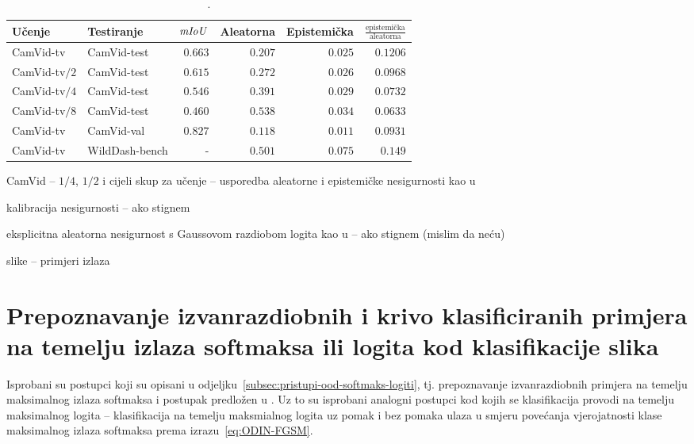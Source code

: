\documentclass[utf8, diplomski, lmodern]{fer}
\begin{document}
\begin{table}
	\centering\small
	\begin{tabular}{llrrrr}
		\toprule
		\bfseries Učenje & \bfseries Testiranje & $\mathit{mIoU}$ & \bfseries Aleatorna & \bfseries Epistemička & $\frac{\text{epistemička}}{\text{aleatorna}}$ \\
		\midrule
		CamVid-tv & CamVid-test & $0.663$ & $0.207$ & $0.025$ & $0.1206$ \\
		CamVid-tv$/2$ & CamVid-test & $0.615$ & $0.272$ & $0.026$ & $0.0968$ \\
		CamVid-tv$/4$ & CamVid-test & $0.546$ & $0.391$ & $0.029$ & $0.0732$ \\
		CamVid-tv$/8$ & CamVid-test & $0.460$ & $0.538$ & $0.034$ & $0.0633$ \\
		\midrule
		CamVid-tv     & CamVid-val  & $0.827$ & $0.118$ & $0.011$ & $0.0931$ \\
		\midrule
		CamVid-tv    & WildDash-bench &      -  & $0.501$ & $0.075$ & $0.149$ \\
		\bottomrule
	\end{tabular}
	\caption{.}
	\label{tab:epistemicka-aleatorna-ucenje-testiranje}
\end{table}


CamVid -- $1/4$, $1/2$ i cijeli skup za učenje -- usporedba aleatorne i epistemičke nesigurnosti kao u \cite{Smith:2018:UMUAED}

kalibracija nesigurnosti -- ako stignem

eksplicitna aleatorna nesigurnost s Gaussovom razdiobom logita kao u \cite{Kendall:2017:WUNBDLCV} -- ako stignem (mislim da neću)

slike -- primjeri izlaza

\section{Prepoznavanje izvanrazdiobnih i krivo klasificiranih primjera na temelju izlaza softmaksa ili logita kod klasifikacije slika}

Isprobani su postupci koji su opisani u odjeljku~\ref{subsec:pristupi-ood-softmaks-logiti}, tj. prepoznavanje izvanrazdiobnih primjera na temelju maksimalnog izlaza softmaksa \citep{Hendrycks:2016:BDMOODE} i postupak predložen u \cite{Liang:2017:PDOODENN}. Uz to su isprobani analogni postupci kod kojih se klasifikacija provodi na temelju maksimalnog logita -- klasifikacija na temelju maksmialnog logita uz pomak i bez pomaka ulaza u smjeru povećanja vjerojatnosti klase maksimalnog izlaza softmaksa prema izrazu~\eqref{eq:ODIN-FGSM}.
\end{document}
